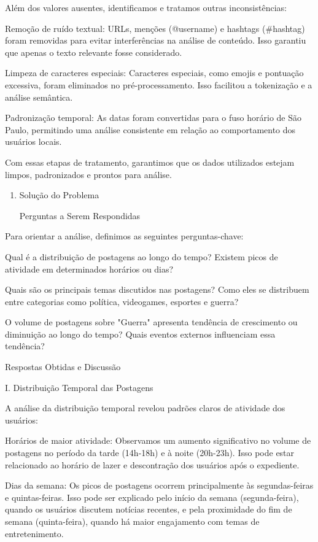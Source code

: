 \documentclass[
  letterpaper,
  DIV=11,
  numbers=noendperiod]{scrartcl}
\begin{document}
Além dos valores ausentes, identificamos e tratamos outras
inconsistências:

\begin{VerbatimWithBreaks}
Remoção de ruído textual:  URLs, menções (@username) e hashtags (#hashtag) foram removidas para evitar interferências na análise de conteúdo. Isso garantiu que apenas o texto relevante fosse considerado. 

Limpeza de caracteres especiais:  Caracteres especiais, como emojis e pontuação excessiva, foram eliminados no pré-processamento. Isso facilitou a tokenização e a análise semântica. 

Padronização temporal:  As datas foram convertidas para o fuso horário de São Paulo, permitindo uma análise consistente em relação ao comportamento dos usuários locais. 
 
\end{VerbatimWithBreaks}

Com essas etapas de tratamento, garantimos que os dados utilizados
estejam limpos, padronizados e prontos para análise.

\begin{enumerate}
\def\labelenumi{\alph{enumi}.}
\setcounter{enumi}{1}
\item
  Solução do Problema

  Perguntas a Serem Respondidas
\end{enumerate}

Para orientar a análise, definimos as seguintes perguntas-chave:

\begin{VerbatimWithBreaks}
Qual é a distribuição de postagens ao longo do tempo?  Existem picos de atividade em determinados horários ou dias? 

Quais são os principais temas discutidos nas postagens?  Como eles se distribuem entre categorias como política, videogames, esportes e guerra? 

O volume de postagens sobre "Guerra" apresenta tendência de crescimento ou diminuição ao longo do tempo?  Quais eventos externos influenciam essa tendência? 
 

Respostas Obtidas e Discussão 
 
\end{VerbatimWithBreaks}

I. Distribuição Temporal das Postagens

A análise da distribuição temporal revelou padrões claros de atividade
dos usuários:

\begin{VerbatimWithBreaks}
Horários de maior atividade:  Observamos um aumento significativo no volume de postagens no período da tarde (14h-18h) e à noite (20h-23h). Isso pode estar relacionado ao horário de lazer e descontração dos usuários após o expediente. 

Dias da semana:  Os picos de postagens ocorrem principalmente às segundas-feiras e quintas-feiras. Isso pode ser explicado pelo início da semana (segunda-feira), quando os usuários discutem notícias recentes, e pela proximidade do fim de semana (quinta-feira), quando há maior engajamento com temas de entretenimento. 
 
\end{VerbatimWithBreaks}
\end{document}
